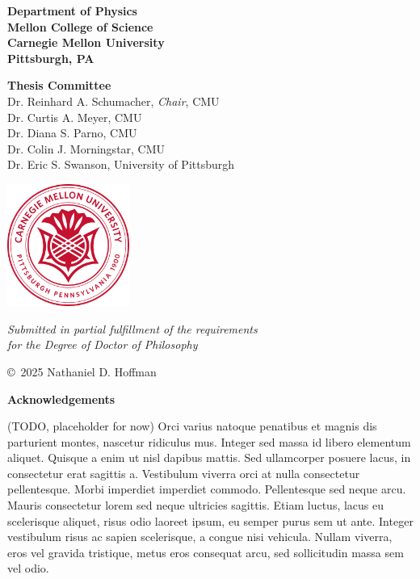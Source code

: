 \documentclass[final]{memoir}
\begin{document}
\begin{center}
  \vspace*{2cm}
  {\LARGE\bfseries Department of Physics\\
  Mellon College of Science\\
  Carnegie Mellon University\\
  Pittsburgh, PA}

  \vfill

  {\large\bfseries Thesis Committee}\\[0.5cm]
  Dr. Reinhard A. Schumacher, \textit{Chair}, CMU\\
  Dr. Curtis A. Meyer, CMU\\
  Dr. Diana S. Parno, CMU\\
  Dr. Colin J. Morningstar, CMU\\
  Dr. Eric S. Swanson, University of Pittsburgh

  \vfill
  \includegraphics[width=0.3\textwidth]{figures/cmu_seal.png}
  \vfill

  {\itshape Submitted in partial fulfillment of the requirements\\for the Degree of Doctor of Philosophy}

  \vspace{2cm}

  {\large\copyright\ 2025 Nathaniel D. Hoffman}

\end{center}

\clearpage
\thispagestyle{empty}
\begin{center}
  \large\bfseries Acknowledgements
\end{center}
\vspace{1cm}
(TODO, placeholder for now) Orci varius natoque penatibus et magnis dis parturient montes, nascetur ridiculus mus. Integer sed massa id libero elementum aliquet. Quisque a enim ut nisl dapibus mattis. Sed ullamcorper posuere lacus, in consectetur erat sagittis a. Vestibulum viverra orci at nulla consectetur pellentesque. Morbi imperdiet imperdiet commodo. Pellentesque sed neque arcu. Mauris consectetur lorem sed neque ultricies sagittis. Etiam luctus, lacus eu scelerisque aliquet, risus odio laoreet ipsum, eu semper purus sem ut ante. Integer vestibulum risus ac sapien scelerisque, a congue nisi vehicula. Nullam viverra, eros vel gravida tristique, metus eros consequat arcu, sed sollicitudin massa sem vel odio.
\end{document}
